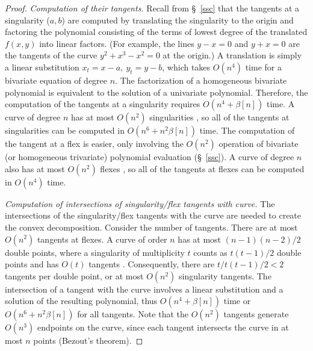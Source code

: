 \begin{proof}
{\em Computation of their tangents.} 
%
Recall from \S~\ref{ssc} that the tangents at a singularity ($a, b$) are 
computed by 
translating the singularity to the origin and factoring the polynomial 
consisting of 
the terms of lowest degree of the translated $f(x,y)$ into linear factors.
(For example, the lines $y-x=0$ and $y+x=0$ are the tangents of the curve
$y^{2} + x^{3} - x^{2} = 0$ at the origin.)
A translation is simply a linear substitution 
$x_{t} = x - a ,\ y_{t} = y - b$,
which takes $O(n^{4})$ time for a bivariate equation of degree $n$.
The factorization of a homogeneous bivariate polynomial is equivalent to the
solution of a univariate polynomial.
Therefore, the computation of the tangents at a singularity requires
$O(n^{4} + \beta[n])$ time.
A curve of degree $n$ has at most $O(n^2)$ singularities \cite{walker},
so all of the tangents at singularities can be computed in 
$O(n^{6} + n^{2}\beta[n])$
time.
The computation of the tangent at a flex is easier, only involving 
the $O(n^{2})$
operation of bivariate (or homogeneous trivariate) polynomial evaluation 
(\S~\ref{ssc}).
A curve of degree $n$ also has at most $O(n^{2})$ flexes \cite{walker},
so all of the tangents at flexes can be computed in $O(n^{4})$ time.

{\em Computation of intersections of singularity/flex tangents with curve.}
%
The intersections of the singularity/flex tangents with the curve are 
needed to
create the convex decomposition.
Consider the number of tangents.
There are at most $O(n^{2})$ tangents at flexes.
A curve of order $n$ has at most $(n-1)(n-2)/2$ double points, where
a singularity of multiplicity $t$ counts as $t(t-1)/2$ double points 
and has $O(t)$ tangents \cite{walker}.
Consequently, there are $t / t(t-1) / 2 < 2$ tangents per double point,
or at most $O(n^{2})$ singularity tangents.
The intersection of a tangent with the curve involves a linear substitution
and a solution of the resulting polynomial, thus $O(n^{4} + \beta[n])$ 
time or
$O(n^{6} + n^{2}\beta[n])$ for all tangents.
Note that the $O(n^{2})$ tangents generate $O(n^{3})$ endpoints on 
the curve, since
each tangent intersects the curve in at most $n$ points (Bezout's theorem).


\end{proof}
